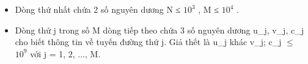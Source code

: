 \begin{itemize}
	\item     Dòng thứ nhất chứa 2 số nguyên dương N ≤ $10^{3}$    , M         ≤ $10^{4}$     .    
	\item      Dòng thứ j trong số M dòng tiếp theo chứa 3 số nguyên dương u\_j, v\_j, c\_j cho biết thông tin về tuyến đường thứ j. Giả thết là u\_j khác v\_j; c\_j  $\le$  $10^{9}$     với j = 1, 2, ..., M.    
\end{itemize}